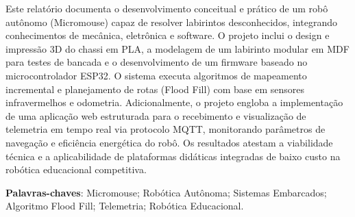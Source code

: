\begin{resumo}

Este relatório documenta o desenvolvimento conceitual e prático de um robô autônomo (Micromouse) capaz de resolver labirintos desconhecidos, integrando conhecimentos de mecânica, eletrônica e software. O projeto inclui o design e impressão 3D do chassi em PLA, a modelagem de um labirinto modular em MDF para testes de bancada e o desenvolvimento de um firmware baseado no microcontrolador ESP32. O sistema executa algoritmos de mapeamento incremental e planejamento de rotas (Flood Fill) com base em sensores infravermelhos e odometria. Adicionalmente, o projeto engloba a implementação de uma aplicação web estruturada para o recebimento e visualização de telemetria em tempo real via protocolo MQTT, monitorando parâmetros de navegação e eficiência energética do robô. Os resultados atestam a viabilidade técnica e a aplicabilidade de plataformas didáticas integradas de baixo custo na robótica educacional competitiva.



\vspace{\onelineskip}
\noindent
\textbf{Palavras-chaves}: Micromouse; Robótica Autônoma; Sistemas Embarcados; Algoritmo Flood Fill; Telemetria; Robótica Educacional.
\end{resumo}


    
